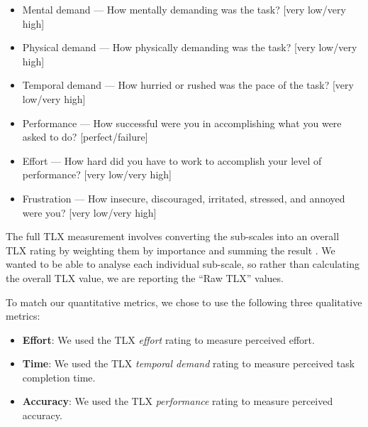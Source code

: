 {\singlespacing
\begin{itemize}
  \item Mental demand --- How mentally demanding was the task? [very low/very high]
  \item Physical demand --- How physically demanding was the task? [very low/very high]
  \item Temporal demand --- How hurried or rushed was the pace of the task?  [very low/very high]
  \item Performance --- How successful were you in accomplishing what you were asked to do? [perfect/failure]
  \item Effort --- How hard did you have to work to accomplish your level of performance? [very low/very high]
  \item Frustration --- How insecure, discouraged, irritated, stressed, and annoyed were you? [very low/very high]
\end{itemize}
}

The full TLX measurement involves converting the sub-scales into an overall TLX rating by weighting them by importance
and summing the result \citep{Hart2006}. We wanted to be able to analyse each individual sub-scale, so rather than
calculating the overall TLX value, we are reporting the ``Raw TLX'' values.

To match our quantitative metrics, we chose to use the following three qualitative metrics:

\begin{itemize}
  \item \textbf{Effort}:
    We used the TLX \textit{effort} rating to measure perceived effort.
  \item \textbf{Time}:
    We used the TLX \textit{temporal demand} rating to measure perceived task completion time.
  \item \textbf{Accuracy}:
    We used the TLX \textit{performance} rating to measure perceived accuracy.
\end{itemize}

